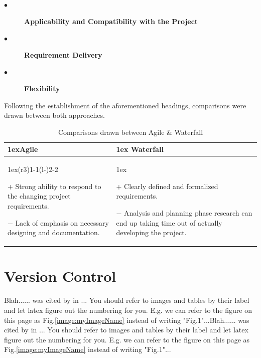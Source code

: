 \begin{description}
  \item[$\bullet$] \textbf{Applicability and Compatibility with the Project}
  \item[$\bullet$] \textbf{Requirement Delivery}
  \item[$\bullet$] \textbf{Flexibility}
\end{description}

Following the establishment of the aforementioned headings, comparisons were drawn between both approaches.

\begin{table}[H]
\begin{tabularx}{\linewidth}{>{\parskip1ex}X@{\kern4\tabcolsep}>{\parskip1ex}X}
\toprule
\hfil\bfseries Agile
&
\hfil\bfseries Waterfall
\\\cmidrule(r{3\tabcolsep}){1-1}\cmidrule(l{-\tabcolsep}){2-2}

\begin{compactitem}[-]
\item[+] Strong ability to respond to the changing project requirements.

\item[$-$] Lack of emphasis on necessary designing and documentation.
\end{compactitem}
\par

&

\begin{compactitem}[-]
\item[+] Clearly defined and formalized requirements.

\item[$-$] Analysis and planning phase research can end up taking time out of actually developing the project.

\end{compactitem}

\\\bottomrule
\end{tabularx}
\caption{Comparisons drawn between Agile \& Waterfall}
\end{table}

\section{Version Control}
Blah...... was cited by \cite{MEAN_STACK} in ... You should refer to images and tables by their label and let latex figure out the numbering for you. E.g. we can refer to the figure on this page as Fig.\ref{image:myImageName} instead of writing "Fig.1"...Blah...... was cited by \cite{MEAN_STACK} in ... You should refer to images and tables by their label and let latex figure out the numbering for you. E.g. we can refer to the figure on this page as Fig.\ref{image:myImageName} instead of writing "Fig.1"...

